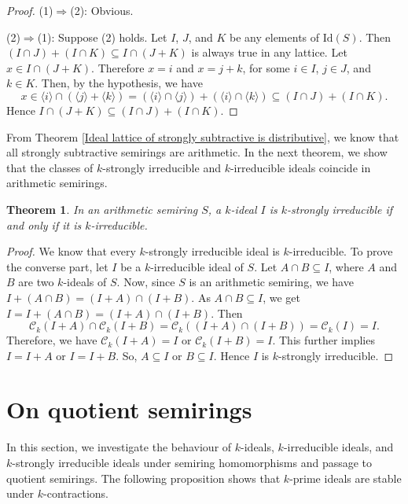 \documentclass[11pt,english]{amsart}
\newcommand{\add}[1]{\textcolor{Red}{#1}}
\newtheorem{theorem}{Theorem}[section]
\theoremstyle{definition}
\newtheorem{example}[theorem]{Example}
\numberwithin{equation}{section}
\begin{document}
\begin{proof}
    (1)$\Rightarrow$(2): Obvious.

    (2)$\Rightarrow$(1): Suppose (2) holds. Let $I$, $J$, and $K$ be any elements of $\mathrm{Id}(S)$. Then $(I\cap J)+(I\cap K)\subseteq I\cap (J+K)$ is always true in any lattice. Let $x\in I\cap (J+K)$. Therefore $x=i$ and $x=j+k$, for some $i\in I$, $j\in J$, and $k\in K$. Then, by the hypothesis, we have 
    \[x\in \langle i \rangle \cap (\langle j \rangle + \langle k \rangle) = (\langle i \rangle \cap \langle j \rangle)+(\langle i \rangle \cap \langle k \rangle) \subseteq (I\cap J)+(I\cap K).\]
    Hence $I\cap (J+K)\subseteq (I\cap J)+(I\cap K)$.
\end{proof}

From Theorem \ref{Ideal lattice of strongly subtractive is distributive}, we know that all strongly subtractive semirings are arithmetic. In the next theorem, we show that the classes of $k$-strongly irreducible and $k$-irreducible ideals coincide in arithmetic semirings. 
\begin{theorem}
    In an arithmetic semiring $S$, a $k$-ideal $I$ is $ k$-strongly irreducible if and only if it is $k$-irreducible.
\end{theorem}

\begin{proof}
    We know that every $k$-strongly irreducible ideal is $k$-irreducible.
To prove the converse part, let $I$ be a $k$-irreducible ideal of $S$. Let $A \cap B \subseteq I$, where $A$ and $B$ are two $k$-ideals of $S$. Now, since $S$ is an arithmetic semiring, we have $I+(A \cap B)=(I+A) \cap (I+B)$. As $A \cap B \subseteq I$, we get $I=I+(A \cap B)=(I+A) \cap (I+B)$. Then \[\mathcal{C}_k(I+A) \cap \mathcal{C}_k(I+B)=\mathcal{C}_k((I+A) \cap (I+B))=\mathcal{C}_k(I)=I.\] Therefore, we have $\mathcal{C}_k(I+A)=I$ or $\mathcal{C}_k(I+B)=I$. This further implies $I=I+A$ or $I=I+B$. So, $A \subseteq I$ or $B \subseteq I$. Hence $I$ is $k$-strongly irreducible.
\end{proof}

\smallskip
\section{On quotient semirings}\label{Section 4: k-ideals of quotient semirings}
In this section, we investigate the behaviour of $k$-ideals, $k$-irreducible ideals, and $k$-strongly irreducible ideals under semiring homomorphisms and passage to quotient semirings. 
The following proposition shows that $k$-prime ideals are stable under $k$-contractions.
\end{document}
